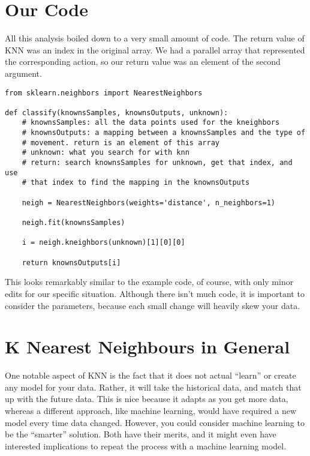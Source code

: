 \documentclass[12pt]{article}
\begin{document}
\section{Our Code}\label{our-code}

All this analysis boiled down to a very small amount of code. The return
value of KNN was an index in the original array. We had a parallel array
that represented the corresponding action, so our return value was an
element of the second argument.

\begin{lstlisting}
from sklearn.neighbors import NearestNeighbors

def classify(knownsSamples, knownsOutputs, unknown):
    # knownsSamples: all the data points used for the kneighbors
    # knownsOutputs: a mapping between a knownsSamples and the type of 
    # movement. return is an element of this array
    # unknown: what you search for with knn
    # return: search knownsSamples for unknown, get that index, and use 
    # that index to find the mapping in the knownsOutputs

    neigh = NearestNeighbors(weights='distance', n_neighbors=1)

    neigh.fit(knownsSamples)

    i = neigh.kneighbors(unknown)[1][0][0]

    return knownsOutputs[i]
\end{lstlisting}

This looks remarkably similar to the example code, of course, with only
minor edits for our specific situation. Although there isn't much code,
it is important to consider the parameters, because each small change
will heavily skew your data.

\section{K Nearest Neighbours in
General}\label{k-nearest-neighbours-in-general}

One notable aspect of KNN is the fact that it does not actual ``learn''
or create any model for your data. Rather, it will take the historical
data, and match that up with the future data. This is nice because it
adapts as you get more data, whereas a different approach, like machine
learning, would have required a new model every time data changed.
However, you could consider machine learning to be the ``smarter''
solution. Both have their merits, and it might even have interested
implications to repeat the process with a machine learning model.
\end{document}
